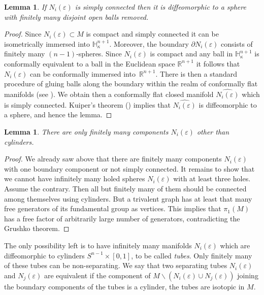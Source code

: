 \documentclass[JEP,XML,SOM,Unicode]{cedram}
\let\moins\smallsetminus
\newtheorem{lemma}[theorem]{Lemma}
\theoremstyle{definition}
\theoremstyle{remark}
\numberwithin{equation}{section}
\begin{document}
\begin{lemma}\label{sc}
If $N_i(\varepsilon)$ is simply connected then it is diffeomorphic to a
sphere with finitely many disjoint open balls removed.
\end{lemma}
\begin{proof}
Since $N_i(\varepsilon)\subset M$ is
compact and simply connected it can be isometrically immersed into
$\mathbb H_{\kappa}^{n+1}$. Moreover, the boundary
$\partial N_i(\varepsilon)$ consists of finitely many $(n-1)$-spheres.
Since $N_i(\varepsilon)$ is compact and any ball in $\mathbb H_{\kappa}^{n+1}$
is conformally equivalent to a ball in the Euclidean space
$\mathbb R^{n+1}$ it follows that $N_i(\varepsilon)$ can be conformally immersed into~$\mathbb R^{n+1}$.
There is then a standard procedure of gluing balls
along the boundary within the realm of conformally flat
manifolds (see \cite[\S2]{Pi}). We obtain then a conformally flat
closed manifold $\widehat{N_i(\varepsilon)}$
which is simply connected. Kuiper's theorem (\cite{Ku1})
implies that $\widehat{N_i(\varepsilon)}$
is diffeomorphic to a sphere, and hence the lemma.
\end{proof}

\begin{lemma}
There are only finitely many components
$N_i(\varepsilon)$ other than cylinders.
\end{lemma}
\begin{proof}
We already saw above that there are finitely
many components $N_i(\varepsilon)$ with one boundary component
or not simply connected. It remains to show that we cannot have
infinitely many holed spheres $N_i(\varepsilon)$
with at least three holes. Assume the contrary.
Then all but finitely many of them should be connected among themselves
using cylinders. But a trivalent graph has at least
that many free generators of its fundamental group as vertices.
This implies that $\pi_1(M)$ has a free factor of
arbitrarily large number of generators, contradicting the
Grushko theorem.
\end{proof}

The only possibility left is to
have infinitely many manifolds $N_i(\varepsilon)$ which are
diffeomorphic to cylinders $S^{n-1}\times [0,1]$, to be called \emph{tubes}.
Only finitely many of these tubes can be non-separating.
We say that two separating tubes $N_i(\varepsilon)$ and $N_j(\varepsilon)$
are equivalent if the component of
$M\moins (N_i(\varepsilon)\cup N_j(\varepsilon))$ joining
the boundary components of the tubes is a cylinder, \ie the tubes are isotopic in $M$.
\end{document}
